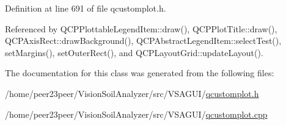 Definition at line 691 of file qcustomplot.\+h.



Referenced by Q\+C\+P\+Plottable\+Legend\+Item\+::draw(), Q\+C\+P\+Plot\+Title\+::draw(), Q\+C\+P\+Axis\+Rect\+::draw\+Background(), Q\+C\+P\+Abstract\+Legend\+Item\+::select\+Test(), set\+Margins(), set\+Outer\+Rect(), and Q\+C\+P\+Layout\+Grid\+::update\+Layout().



The documentation for this class was generated from the following files\+:\begin{DoxyCompactItemize}
\item 
/home/peer23peer/\+Vision\+Soil\+Analyzer/src/\+V\+S\+A\+G\+U\+I/\hyperlink{qcustomplot_8h}{qcustomplot.\+h}\item 
/home/peer23peer/\+Vision\+Soil\+Analyzer/src/\+V\+S\+A\+G\+U\+I/\hyperlink{qcustomplot_8cpp}{qcustomplot.\+cpp}\end{DoxyCompactItemize}

